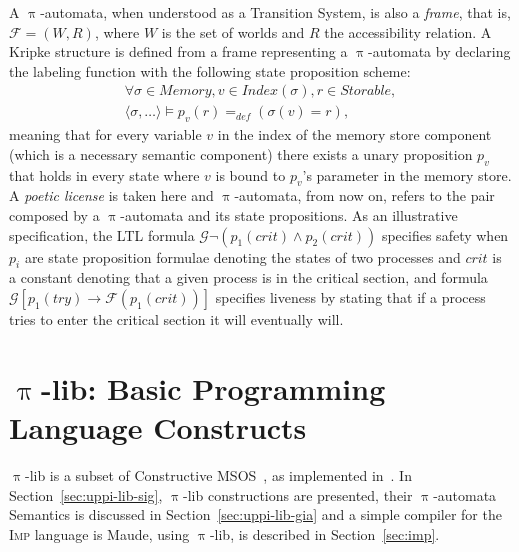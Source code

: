 \documentclass{llncs}%
\begin{document}
A $\uppi$-automata, when understood as a Transition System, is also a \emph{frame}, that is, $\mathcal{F} = (W, R)$, where $W$ is the set of worlds and $R$ the accessibility relation. A Kripke structure is defined from a frame representing a $\uppi$-automata by declaring the labeling function with the following state proposition scheme:
\begin{eqnarray}
\forall \sigma \in \mathit{Memory}, v \in \mathit{Index}(\sigma), r \in \mathit{Storable}, \nonumber\\
\langle \sigma, \ldots \rangle \models p_v(r) =_{\mathit{def}} (\sigma(v) = r),
\end{eqnarray}
meaning that for every variable $v$ in the index of the memory store component (which is a necessary semantic component) there exists a unary proposition $p_v$ that holds in every state where $v$ is bound to $p_v$'s parameter in the memory store.  A \emph{poetic license} is taken here and $\uppi$-automata, from now on, refers to the pair composed by a $\uppi$-automata and its state propositions.
As an illustrative specification, the LTL formula $\mathcal{G} \neg(p_1(\mathit{crit}) \land p_2(\mathit{crit}))$ specifies safety when $p_i$ are state proposition formulae denoting the states of two processes and $\mathit{crit}$ is a constant denoting that a given process is in the critical section, and formula $\mathcal{G}[p_1(\mathit{try}) \to \mathcal{F} (p_1(\mathit{crit}))]$ specifies liveness by stating that if a process tries to enter the critical section it will eventually will.

\section{$\uppi$-lib: Basic Programming Language Constructs}\label{sec:uppi-lib}

$\uppi$-lib is a subset of Constructive MSOS~\cite{Mosses:2004:FCF}, as implemented in~\cite[Ch. 6]{msc-chalub}.
In Section~\ref{sec:uppi-lib-sig}, $\uppi$-lib constructions are presented, their $\uppi$-au\-to\-ma\-ta Semantics is discussed in Section~\ref{sec:uppi-lib-gia} and a simple compiler for the \textsc{Imp} language is Maude, using $\uppi$-lib, is described in Section~\ref{sec:imp}.
\end{document}

